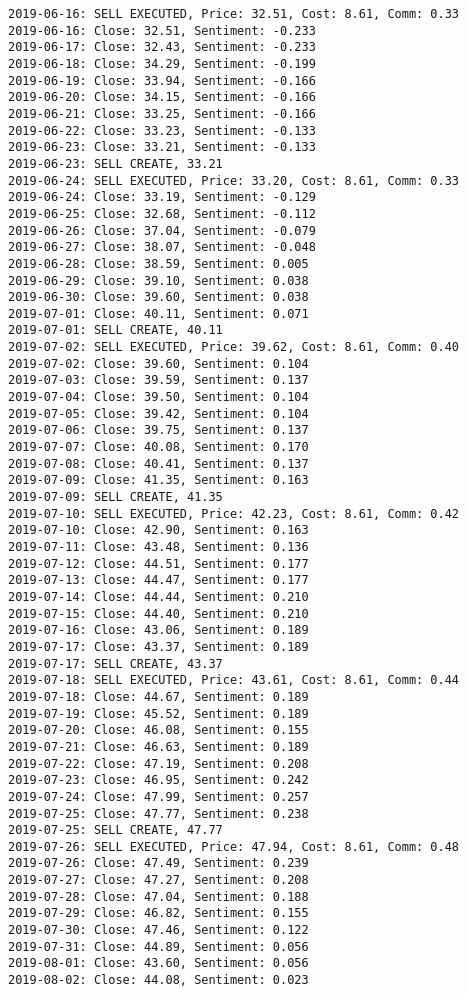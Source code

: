 \documentclass[11pt]{article}
\begin{document}
\begin{Verbatim}[commandchars=\\\{\}]
2019-06-16: SELL EXECUTED, Price: 32.51, Cost: 8.61, Comm: 0.33
2019-06-16: Close: 32.51, Sentiment: -0.233
2019-06-17: Close: 32.43, Sentiment: -0.233
2019-06-18: Close: 34.29, Sentiment: -0.199
2019-06-19: Close: 33.94, Sentiment: -0.166
2019-06-20: Close: 34.15, Sentiment: -0.166
2019-06-21: Close: 33.25, Sentiment: -0.166
2019-06-22: Close: 33.23, Sentiment: -0.133
2019-06-23: Close: 33.21, Sentiment: -0.133
2019-06-23: SELL CREATE, 33.21
2019-06-24: SELL EXECUTED, Price: 33.20, Cost: 8.61, Comm: 0.33
2019-06-24: Close: 33.19, Sentiment: -0.129
2019-06-25: Close: 32.68, Sentiment: -0.112
2019-06-26: Close: 37.04, Sentiment: -0.079
2019-06-27: Close: 38.07, Sentiment: -0.048
2019-06-28: Close: 38.59, Sentiment: 0.005
2019-06-29: Close: 39.10, Sentiment: 0.038
2019-06-30: Close: 39.60, Sentiment: 0.038
2019-07-01: Close: 40.11, Sentiment: 0.071
2019-07-01: SELL CREATE, 40.11
2019-07-02: SELL EXECUTED, Price: 39.62, Cost: 8.61, Comm: 0.40
2019-07-02: Close: 39.60, Sentiment: 0.104
2019-07-03: Close: 39.59, Sentiment: 0.137
2019-07-04: Close: 39.50, Sentiment: 0.104
2019-07-05: Close: 39.42, Sentiment: 0.104
2019-07-06: Close: 39.75, Sentiment: 0.137
2019-07-07: Close: 40.08, Sentiment: 0.170
2019-07-08: Close: 40.41, Sentiment: 0.137
2019-07-09: Close: 41.35, Sentiment: 0.163
2019-07-09: SELL CREATE, 41.35
2019-07-10: SELL EXECUTED, Price: 42.23, Cost: 8.61, Comm: 0.42
2019-07-10: Close: 42.90, Sentiment: 0.163
2019-07-11: Close: 43.48, Sentiment: 0.136
2019-07-12: Close: 44.51, Sentiment: 0.177
2019-07-13: Close: 44.47, Sentiment: 0.177
2019-07-14: Close: 44.44, Sentiment: 0.210
2019-07-15: Close: 44.40, Sentiment: 0.210
2019-07-16: Close: 43.06, Sentiment: 0.189
2019-07-17: Close: 43.37, Sentiment: 0.189
2019-07-17: SELL CREATE, 43.37
2019-07-18: SELL EXECUTED, Price: 43.61, Cost: 8.61, Comm: 0.44
2019-07-18: Close: 44.67, Sentiment: 0.189
2019-07-19: Close: 45.52, Sentiment: 0.189
2019-07-20: Close: 46.08, Sentiment: 0.155
2019-07-21: Close: 46.63, Sentiment: 0.189
2019-07-22: Close: 47.19, Sentiment: 0.208
2019-07-23: Close: 46.95, Sentiment: 0.242
2019-07-24: Close: 47.99, Sentiment: 0.257
2019-07-25: Close: 47.77, Sentiment: 0.238
2019-07-25: SELL CREATE, 47.77
2019-07-26: SELL EXECUTED, Price: 47.94, Cost: 8.61, Comm: 0.48
2019-07-26: Close: 47.49, Sentiment: 0.239
2019-07-27: Close: 47.27, Sentiment: 0.208
2019-07-28: Close: 47.04, Sentiment: 0.188
2019-07-29: Close: 46.82, Sentiment: 0.155
2019-07-30: Close: 47.46, Sentiment: 0.122
2019-07-31: Close: 44.89, Sentiment: 0.056
2019-08-01: Close: 43.60, Sentiment: 0.056
2019-08-02: Close: 44.08, Sentiment: 0.023

\end{Verbatim}
\end{document}
